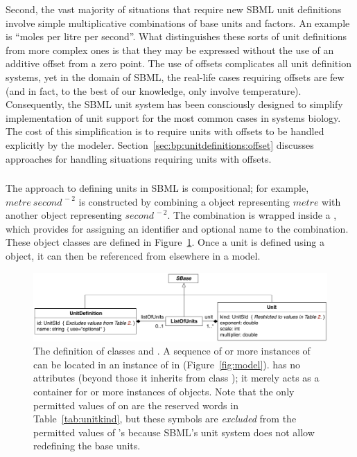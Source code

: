Second, the vast majority of situations that require new SBML unit
definitions involve simple multiplicative combinations of base
units and factors.  An example is ``moles per litre per second''.
What distinguishes these sorts of unit definitions from more
complex ones is that they may be expressed without the use of an
additive offset from a zero point.  The use of offsets complicates
all unit definition systems, yet in the domain of SBML, the
real-life cases requiring offsets are few (and in fact, to the
best of our knowledge, only involve temperature).  Consequently,
the SBML unit system has been consciously designed to simplify
implementation of unit support for the most common cases in
systems biology.  The cost of this simplification is to require
units with offsets to be handled explicitly by the modeler.
Section~\ref{sec:bp:unitdefinitions:offset} discusses approaches
for handling situations requiring units with offsets.


\subsubsection{}
\label{sec:unitdefinition-structure}

The approach to defining units in SBML is compositional; for
example, $metre\ second^{\,-2}$ is constructed by combining a
\Unit object representing $metre$ with another \Unit object
representing $second^{\,-2}$.  The combination is wrapped inside a
\UnitDefinition, which provides for assigning an identifier and
optional name to the combination.  These object classes are
defined in Figure~\ref{fig:unitdefinition}.  Once a unit is
defined using a \UnitDefinition object, it can then be referenced
from elsewhere in a model.

\begin{figure}[htb]
  \centering
  \vspace*{1ex}
  \includegraphics[scale=0.78]{figs/unitdefinition-uml}
  \caption{The definition of classes \UnitDefinition and
      \Unit.  A sequence of  or more instances of
      \UnitDefinition can be located in an instance of
      \ListOfUnitDefinitions in \Model
      (Figure~\protect\ref{fig:model}).  \ListOfUnits has
      no attributes (beyond those it inherits from class \SBaseUpright);
      it merely acts as a container for  or more instances of
      \Unit objects.  Note that the only permitted values of
       on \Unit are the reserved words in
      Table~\vref{tab:unitkind}, but these symbols are
      \emph{excluded} from the permitted values of
      \UnitDefinition's  because SBML's unit system does
      not allow redefining the base units.}
  \label{fig:unitdefinition}
\end{figure}

